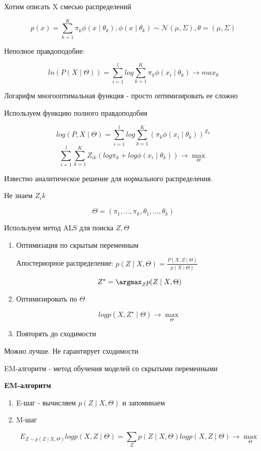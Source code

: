 \documentclass[a4paper, 12pt]{article}
\begin{document}
Хотим описать X смесью распределений

\[p(x) = \sum_{k = 1}^K \pi_k \phi(x \mid \theta_k), \phi(x \mid \theta_k) \sim \mathcal{N}(\mu, \Sigma), \theta = (\mu, \Sigma)\]

Неполное правдоподобие:

\[ln(P(X \mid \Theta)) = \sum_{i = 1}^{l} log \sum_{k = 1}^K \pi_k \phi(x_i \mid \theta_k) \rightarrow max_{\theta}\]

Логарифм многооптимальная функция - просто оптимизировать ее сложно

Используем функцию полного правдоподобия

\[log(P, X \mid \Theta) = \sum_{i = 1}^{l} log \sum_{k = 1}^{K} (\pi_k \phi(x_i \mid \theta_k))^{Z_k}\]
\[\sum_{i = 1}^{l}\sum_{k = 1}^{K} Z_{ik}(log\pi_k + log\phi(x_i \mid \theta_k)) \rightarrow \max_{\Theta}\]

Известно аналитическое решение для нормального распределения.

Не знаем $Z_ik$

\[\Theta = (\pi_1, \ldots, \pi_k, \theta_1, \ldots, \theta_k)\]

Используем метод ALS для поиска $Z, \Theta$

\begin{enumerate}
    \item Оптимизация по скрытым переменным
    
    Апостериорное распределение: \(p(Z \mid X, \Theta) = \frac{P(X, Z \mid \Theta)}{p(X \mid \Theta)}\)

    \[Z^{\star} = \argmax_{Z} p(Z \mid X, \Theta)\]

    \item Оптимизировать по $\Theta$
    
    \[log p(X, Z^{\star} \mid \Theta) \rightarrow \max_{\Theta}\]
    \item Повторять до сходимости
\end{enumerate}

Можно лучше. Не гарантирует сходимости


EM-алгоритм - метод обучения моделей со скрытыми переменными

\textbf{EM-алгоритм}

\begin{enumerate}
    \item E-шаг - вычисляем $p(Z \mid X, \Theta)$ и запоминаем
    \item M-шаг
    
    \[E_{Z \sim p(Z \mid X, \Theta)}log p(X, Z \mid \Theta) = 
    \sum_{Z} p(Z \mid X, \Theta)log p(X, Z \mid \Theta) 
    \rightarrow \max_{\Theta}\]
\end{enumerate}
\end{document}
